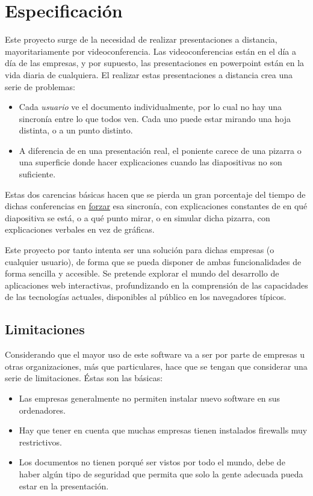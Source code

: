 \section{Especificaci\'on} %
\label{sec:especificacion}

Este proyecto surge de la necesidad de realizar presentaciones a distancia, mayoritariamente por videoconferencia. Las videoconferencias están en el día a día de las empresas, y por supuesto, las presentaciones en powerpoint están en la vida diaria de cualquiera. El realizar estas presentaciones a distancia crea una serie de problemas:

\begin{itemize}
	\item Cada \emph{usuario} ve el documento individualmente, por lo cual no hay una sincronía entre lo que todos ven. Cada uno puede estar mirando una hoja distinta, o a un punto distinto.
	\item A diferencia de en una presentación real, el poniente carece de una pizarra o una superficie donde hacer explicaciones cuando las diapositivas no son suficiente.
\end{itemize}

Estas dos carencias básicas hacen que se pierda un gran porcentaje del tiempo de dichas conferencias en \underline{forzar} esa sincronía, con explicaciones constantes de en qué diapositiva se está, o a qué punto mirar, o en simular dicha pizarra, con explicaciones verbales en vez de gráficas.

Este proyecto por tanto intenta ser una solución para dichas empresas (o cualquier usuario), de forma que se pueda disponer de ambas funcionalidades de forma sencilla y accesible. Se pretende explorar el mundo del desarrollo de aplicaciones web interactivas, profundizando en la comprensión de las capacidades de las tecnologías actuales, disponibles al público en los navegadores típicos.

\subsection{Limitaciones}
Considerando que el mayor uso de este software va a ser por parte de empresas u otras organizaciones, más que particulares, hace que se tengan que considerar una serie de limitaciones. Éstas son las básicas:

\begin{itemize}
	\item Las empresas generalmente no permiten instalar nuevo software en sus ordenadores.
	\item Hay que tener en cuenta que muchas empresas tienen instalados firewalls muy restrictivos.
	\item Los documentos no tienen porqué ser vistos por todo el mundo, debe de haber algún tipo de seguridad que permita que solo la gente adecuada pueda estar en la presentación.
\end{itemize}



